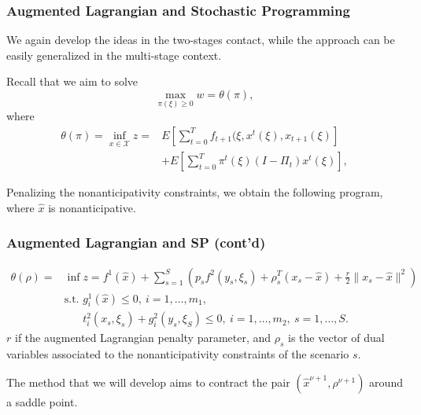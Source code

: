 \documentclass[french]{beamer}
\begin{document}
\begin{frame}
\frametitle{Augmented Lagrangian and Stochastic Programming}

We again develop the ideas in the two-stages contact, while the approach can be easily generalized in the multi-stage context.

\mbox{}

Recall that we aim to solve
\[
\max_{\pi(\xi) \geq 0} w = \theta(\pi),
\]
where
\begin{align*}
\theta(\pi) = \inf_{x \in \mathcal{X}} z = & 
E\left[\sum_{t = 0}^T f_{t+1} (\xi, x^t(\xi), x_{t+1}(\xi) \right] \\
& + E\left[\sum_{t = 0}^T \pi^t(\xi)(I-\Pi_t)x^t(\xi) \right],
\end{align*}

Penalizing the nonanticipativity constraints, we obtain the following program, where $\hat{x}$ is nonanticipative.

\end{frame}

\begin{frame}
\frametitle{Augmented Lagrangian and SP (cont'd)}

\vspace*{-0.5cm}

\begin{align*}
\theta(\rho) = & \inf z = f^1(\hat{x}) + \sum_{s=1}^{S} \left(
  p_sf^2(y_s,\xi_s) + \rho_s^T(x_s-\hat{x}) + \frac{r}{2} \|
x_s-\hat{x} \|^2\right) \\
& \text{s.t. } g_i^1(\hat{x}) \leq 0,\ i=1,\ldots{},m_1,\\
& \phantom{\text{s.t. }} t_i^2(x_s,\xi_s)+g_i^2(y_s,\xi_S) \leq 0,\ 
i=1,\ldots{},m_2,\ s=1,\ldots{},S.
\end{align*}
$r$ if the augmented Lagrangian penalty parameter, and $\rho_s$ is the vector of dual variables associated to the nonanticipativity constraints of the scenario  $s$.

\mbox{}

The method that we will develop aims to contract the pair $(\hat{x}^{\nu+1}, \rho^{\nu+1})$ around a saddle point.

\end{frame}
\end{document}
